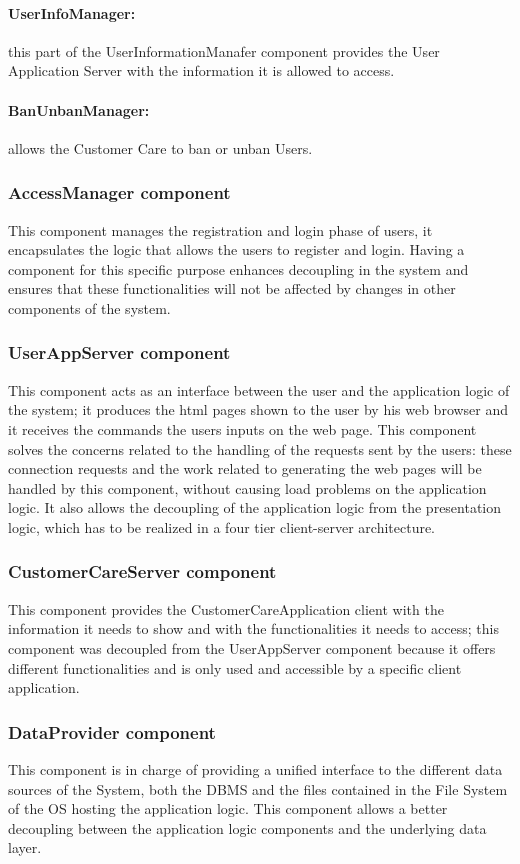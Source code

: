 \paragraph{UserInfoManager:} this part of the UserInformationManafer component provides the User Application Server with the information it is allowed to access.
\paragraph{BanUnbanManager:} allows the Customer Care to ban or unban Users.
\subsubsection{AccessManager component}
This component manages the registration and login phase of users, it encapsulates the logic that allows the users to register and login. Having a component for this specific purpose enhances decoupling in the system and ensures that these functionalities will not be affected by changes in other components of the system.

\subsubsection{UserAppServer component}
This component acts as an interface between the user and the application logic of the system; it produces the html pages shown to the user by his web browser and it receives the commands the users inputs on the web page. This component solves the concerns related to the handling of the requests sent by the users: these connection requests and the work related to generating the web pages will be handled by this component, without causing load problems on the application logic. It also allows the decoupling of the application logic from the presentation logic, which has to be realized in a four tier client-server architecture.

\subsubsection{CustomerCareServer component}
This component provides the CustomerCareApplication client with the information it needs to show and with the functionalities it needs to access; this component was decoupled from the UserAppServer component because it offers different functionalities and is only used and accessible by a specific client application.

\subsubsection{DataProvider component}
This component is in charge of providing a unified interface to the different data sources of the System, both the DBMS and the files contained in the File System of the OS hosting the application logic. This component allows a better decoupling between the application logic components and the underlying data layer.

